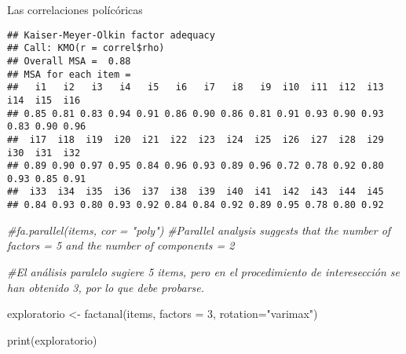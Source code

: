 \documentclass[
]{article}
\newenvironment{Shaded}{\begin{snugshade}}{\end{snugshade}}
\newcommand{\AttributeTok}[1]{\textcolor[rgb]{0.77,0.63,0.00}{#1}}
\newcommand{\CommentTok}[1]{\textcolor[rgb]{0.56,0.35,0.01}{\textit{#1}}}
\newcommand{\DecValTok}[1]{\textcolor[rgb]{0.00,0.00,0.81}{#1}}
\newcommand{\FunctionTok}[1]{\textcolor[rgb]{0.00,0.00,0.00}{#1}}
\newcommand{\NormalTok}[1]{#1}
\newcommand{\OtherTok}[1]{\textcolor[rgb]{0.56,0.35,0.01}{#1}}
\newcommand{\SpecialCharTok}[1]{\textcolor[rgb]{0.00,0.00,0.00}{#1}}
\newcommand{\StringTok}[1]{\textcolor[rgb]{0.31,0.60,0.02}{#1}}
\begin{document}
Las correlaciones polícóricas

\begin{Shaded}
\end{Shaded}

\begin{verbatim}
## Kaiser-Meyer-Olkin factor adequacy
## Call: KMO(r = correl$rho)
## Overall MSA =  0.88
## MSA for each item = 
##   i1   i2   i3   i4   i5   i6   i7   i8   i9  i10  i11  i12  i13  i14  i15  i16 
## 0.85 0.81 0.83 0.94 0.91 0.86 0.90 0.86 0.81 0.91 0.93 0.90 0.93 0.83 0.90 0.96 
##  i17  i18  i19  i20  i21  i22  i23  i24  i25  i26  i27  i28  i29  i30  i31  i32 
## 0.89 0.90 0.97 0.95 0.84 0.96 0.93 0.89 0.96 0.72 0.78 0.92 0.80 0.93 0.85 0.91 
##  i33  i34  i35  i36  i37  i38  i39  i40  i41  i42  i43  i44  i45 
## 0.84 0.93 0.80 0.93 0.92 0.84 0.84 0.92 0.89 0.95 0.78 0.80 0.92
\end{verbatim}

\begin{Shaded}
\begin{Highlighting}[]
\CommentTok{\#fa.parallel(items, cor = "poly")}
\CommentTok{\#Parallel analysis suggests that the number of factors =  5  and the number of components =  2   }

\CommentTok{\#El análisis paralelo sugiere 5 items, pero en el procedimiento de interesección se han obtenido 3, por lo que debe probarse.}


\NormalTok{exploratorio }\OtherTok{\textless{}{-}} \FunctionTok{factanal}\NormalTok{(items, }\AttributeTok{factors =} \DecValTok{3}\NormalTok{, }\AttributeTok{rotation=}\StringTok{"varimax"}\NormalTok{)}

\FunctionTok{print}\NormalTok{(exploratorio)}
\end{Highlighting}
\end{Shaded}
\end{document}
